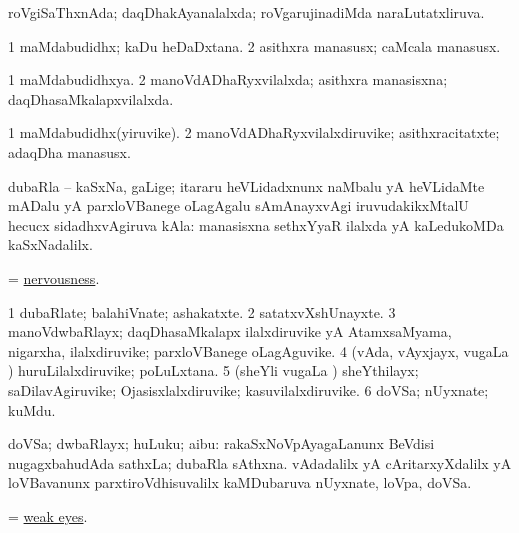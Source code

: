 \bentry
{} 
\gl{\gu}
\bmng
roVgiSaThxnAda; daqDhakAyanalalxda; roVgarujinadiMda naraLutatxliruva. 
\emng
\eentry

\bentry
{} 
\gl{\nA}
\expl{}
\bmng
\bnum
\num{1} maMdabudidhx; kaDu heDaDxtana. 
\num{2} asithxra manasusx; caMcala manasusx. 
\enum
\emng
\eentry

\bentry
{} 
\gl{\gu}
\expl{}
\bmng
\bnum
\num{1} maMdabudidhxya. 
\num{2} manoVdADhaRyxvilalxda; asithxra manasisxna; daqDhasaMkalapxvilalxda. 
\enum
\emng
\eentry

\bentry
{} 
\gl{\nA}
\expl{}
\bmng
\bnum
\num{1} maMdabudidhx(yiruvike). 
\num{2} manoVdADhaRyxvilalxdiruvike; asithxracitatxte; adaqDha manasusx. 
\enum
\emng
\eentry

\bentry
{} 
\gl{\nA}
\bmng
dubaRla -- kaSxNa, gaLige; itararu heVLidadxnunx naMbalu yA heVLidaMte mADalu yA parxloVBanege oLagAgalu sAmAnayxvAgi iruvudakikxMtalU hecucx sidadhxvAgiruva kAla:  manasisxna sethxYyaR ilalxda yA kaLedukoMDa kaSxNadalilx. 
\emng
\eentry

\bentry
{}
\gl{\nA}
\bmng
= \hyperref{kandict_n.pdf}{N}{nervousness}{nervousness}. 
\emng
\eentry

\bentry
{} 
\gl{\nA}
\expl{}
\bmng
\bnum
\num{1} dubaRlate; balahiVnate; ashakatxte. 
\num{2} satatxvXshUnayxte. 
\num{3} manoVdwbaRlayx; daqDhasaMkalapx ilalxdiruvike yA AtamxsaMyama, nigarxha, ilalxdiruvike; parxloVBanege oLagAguvike. 
\num{4} (vAda, vAyxjayx, \mo vugaLa \vi) huruLilalxdiruvike; poLuLxtana. 
\num{5} (sheYli \mo vugaLa \vi) sheYthilayx; saDilavAgiruvike; Ojasisxlalxdiruvike; kasuvilalxdiruvike. 
\num{6} doVSa; nUyxnate; kuMdu. 
\enum
\emng
\eentry

\bentry
{} 
\gl{\nA}
\expl{}
\bmng
doVSa; dwbaRlayx; huLuku; aibu: 
\banum
{} rakaSxNoVpAyagaLanunx BeVdisi nugagxbahudAda sathxLa; dubaRla sAthxna. 
 vAdadalilx yA cAritarxyXdalilx yA loVBavanunx parxtiroVdhisuvalilx kaMDubaruva nUyxnate, loVpa, doVSa. 
\eanum
\emng
\eentry

\bentry
{} 
\gl{\nA}
\expl{}
\bmng
= \hyperlink{weak eyes}{weak eyes}. 
\emng
\eentry

